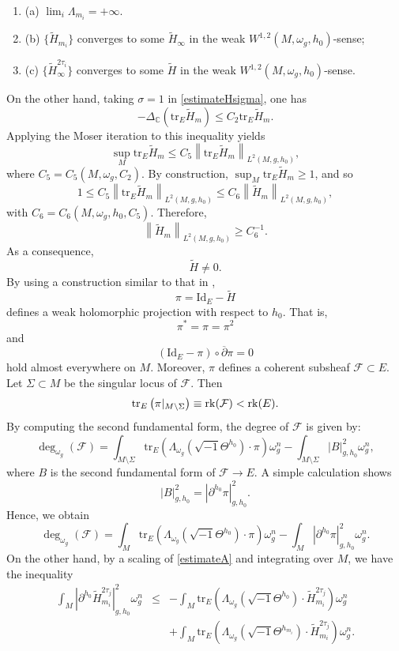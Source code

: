 \documentclass[12pt, reqno]{amsart}
\newcommand\cF{{\mathcal F}}
\newcommand{\id}{{\rm id}}
\newcommand{\rk}{{\rm rk}}
\newcommand\bp{{\bar\partial}}
\theoremstyle{plain}
\theoremstyle{definition}
\newcommand{\sq}{\sqrt{-1}}
\newcommand{\p}{\partial}
\renewcommand{\bar}{\overline}
\newcommand{\beq}{\begin{equation}}
\newcommand{\eeq}{\end{equation}}
\newcommand{\bd}{\begin{enumerate}}
\newcommand{\ed}{\end{enumerate}}
\renewcommand{\tilde}{\widetilde}
\renewcommand{\bp}{\bar{\partial}}
\renewcommand{\>}{\rightarrow}
\newcommand{\C}{{\mathbb C}}
\renewcommand{\>}{\rightarrow}
\renewcommand{\p}{{\partial}}
\renewcommand{\bp}{{\bar{\partial}}}
\newcommand{\om}{\omega}
\renewcommand{\bar}{\overline}
\renewcommand{\tilde}{\widetilde}
\renewcommand{\id}{\mathrm{Id}}
\newcommand{\tr}{\mathrm{tr}}
\numberwithin{equation}{section} %
\begin{document}
\bd \item [(a)] $\lim_i\Lambda_{m_i}=+\infty$.
\item[(b)] $ \{\tilde H_{m_i}\}$ converges to  some  $\tilde H_\infty$ in the weak $ W^{1,2}(M, \omega_g, h_0) $-sense;
\item[(c)] $ \{\tilde H^{2\tau_i}_\infty\}$ converges to some $ \tilde H $ in the weak $ W^{1,2}(M, \omega_g, h_0) $-sense.
\ed On the other hand,  taking $\sigma=1$  in
\eqref{estimateHsigma}, one has \beq -\Delta_\C \left(\tr_E \tilde
H_m\right)\leq C_2\tr_E\tilde H_m. \eeq Applying the Moser iteration
to this inequality yields \beq \sup_M  \tr_E \tilde H_m \leq
C_5\left\|\tr_E \tilde H_m\right\|_{L^2(M,g,h_0)}, \eeq where
$C_5=C_5(M, \omega_g, C_2)$. By construction, $ \sup_M\tr_E\tilde
H_m\geq1$,  and so \beq 1\leq C_5\left\|\tr_E \tilde
H_m\right\|_{L^2(M,g,h_0)} \leq C_6\left\|\tilde
H_m\right\|_{L^2(M,g,h_0)}, \eeq with $C_6=C_6(M, \om_g,h_0, C_5)$.
Therefore, \beq \left\|\tilde H_m\right\|_{L^2(M,g,h_0)}\geq
C_6^{-1}.\eeq As a consequence,
$$\tilde H\neq 0. $$   By using a construction similar to that in \cite{UY86},
\beq  \pi = \mathrm{Id}_E - \tilde H \eeq  defines a weak
holomorphic projection with respect to  $ h_0 $. That is, \beq
\pi^*=\pi=\pi^2\eeq and \beq  \left(\id_E-\pi\right)\circ \bp\pi =0
\eeq hold almost everywhere on $M$. Moreover, $\pi$ defines a
coherent subsheaf $\cF\subset E$.  Let $\Sigma\subset M$ be the
singular locus of $\cF$. Then
\beq \mathrm{tr}_E\left(\pi|_{M\setminus\Sigma}\right)\equiv \rk(\cF) <\rk(E).\eeq
By computing the second fundamental form, the degree of $\cF$ is
given by: \beq \deg_{\omega_g}(\cF) = \int_{M\setminus \Sigma}
\tr_{E}\left(\Lambda_{\om_g}\left(\sq\Theta^{h_0}\right)\cdot
\pi\right)\om_g^n -\int_{M\setminus \Sigma} \left|B\right|_{g,h_0}^2
\om_g^n, \eeq where $B$ is the second fundamental form of $ \cF\>E$.
A simple calculation shows \beq |B|^2_{g,h_0}=|\p^{h_0}\pi|^2_{g,
	h_0}.\eeq Hence, we obtain \beq \deg_{\omega_g}(\cF) = \int_{M}
\tr_{E}\left(\Lambda_{\om_g}\left(\sq\Theta^{h_0}\right)\cdot
\pi\right)\om_g^n -\int_{M} \left|\partial^{h_0}
\pi\right|_{g,h_0}^2 \om_g^n. \label{degree} \eeq On the other hand,
by a scaling of \eqref{estimateA} and integrating over $M$,  we have
the inequality
\begin{eqnarray}
\int_M  \left|\p^{h_0}\tilde H_{m_i}^{2\tau_j}\right|_{g,h_0}^2
\om_g^n
&\leq& -\int_M\tr_E\left( \Lambda_{\om_g}\left(\sq \Theta^{h_0}\right) \cdot \tilde H_{m_i}^{2\tau_j}\right)\om_g^n\nonumber\\
&&+ \int_M\tr_E\left(\Lambda_{\om_g}\left(\sq
\Theta^{h_{m_i}}\right)\cdot \tilde H_{m_i}^{2\tau_j}\right)\om_g^n.
\end{eqnarray}
\end{document}
